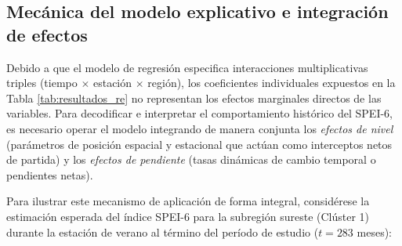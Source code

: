 \subsection{Mecánica del modelo explicativo e integración de efectos}

Debido a que el modelo de regresión especifica interacciones multiplicativas triples (tiempo $\times$ estación $\times$ región), los coeficientes individuales expuestos en la Tabla \ref{tab:resultados_re} no representan los efectos marginales directos de las variables. Para decodificar e interpretar el comportamiento histórico del SPEI-6, es necesario operar el modelo integrando de manera conjunta los \textit{efectos de nivel} (parámetros de posición espacial y estacional que actúan como interceptos netos de partida) y los \textit{efectos de pendiente} (tasas dinámicas de cambio temporal o pendientes netas).

Para ilustrar este mecanismo de aplicación de forma integral, considérese la estimación esperada del índice SPEI-6 para la subregión sureste (Clúster 1) durante la estación de verano al término del período de estudio ($t = 283$ meses):

